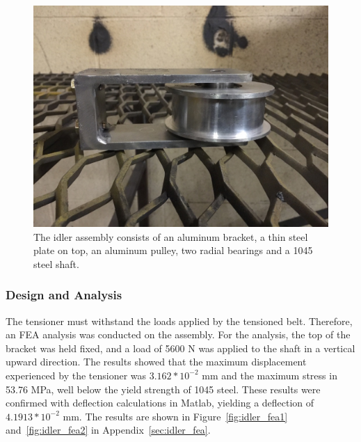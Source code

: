 \begin{figure}[htbp]
\centering
\includegraphics[height=0.3\textheight]{images/idler_assembly_bld}
\caption[Idler Assembly]{The idler assembly consists of an aluminum bracket, a thin steel plate on top, an aluminum pulley, two radial bearings and a 1045 steel shaft.}
\label{fig:idler}
\end{figure}

\subsubsection{Design and Analysis}

The tensioner must withstand the loads applied by the tensioned belt. Therefore, an FEA analysis was conducted on the assembly. For the analysis, the top of the bracket was held fixed, and a load of 5600 N was applied to the shaft in a vertical upward direction. The results showed that the maximum displacement experienced by the tensioner was ${3.162*10^{-2}}$ mm and the maximum stress in 53.76 MPa, well below the yield strength of 1045 steel. These results were confirmed with deflection calculations in Matlab, yielding a deflection of ${4.1913*10^{-2}}$ mm. The results are shown in Figure~\ref{fig:idler_fea1} and~\ref{fig:idler_fea2} in Appendix~\ref{sec:idler_fea}.


